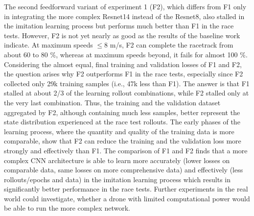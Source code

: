 The second feedforward variant of experiment 1 (F2),
which differs from F1 only in integrating the more complex Resnet14 instead of the Resnet8,
also stalled in the imitation learning process but 
performs much better than F1 in the race tests.
However, F2 is not yet nearly as good as the results of the baseline work indicate.
At maximum speeds $\le 8$ m/s, F2 can complete the racetrack from about 60 to 80 \%,
whereas at maximum speeds beyond, it fails for almost 100 \%.
Considering the almost equal, final training and validation losses of F1 and F2, 
the question arises why F2 outperforms F1 in the race tests,
especially since F2 collected only 29k training samples (i.e., 47k less than F1).
The answer is that F1 stalled at about 2/3 of the learning rollout combinations,
while F2 stalled only at the very last combination.
Thus, the training and the validation dataset aggregated by F2,
although containing much less samples,
better represent the state distribution experienced at the race test rollouts.
The early phases of the learning process,
where the quantity and quality of the training data is more comparable,
show that F2 can reduce the training and the validation loss more strongly and effectively than F1.
The comparison of F1 and F2
finds that a more complex CNN architecture
is able to learn more accurately
(lower losses on comparable data, same losses on more comprehensive data)
and effectively 
(less rollouts/epochs and data)
in the imitation learning process
which results in significantly better performance in the race tests.
Further experiments in the real world
could investigate, whether a drone with limited computational power 
would be able to run the more complex network.


